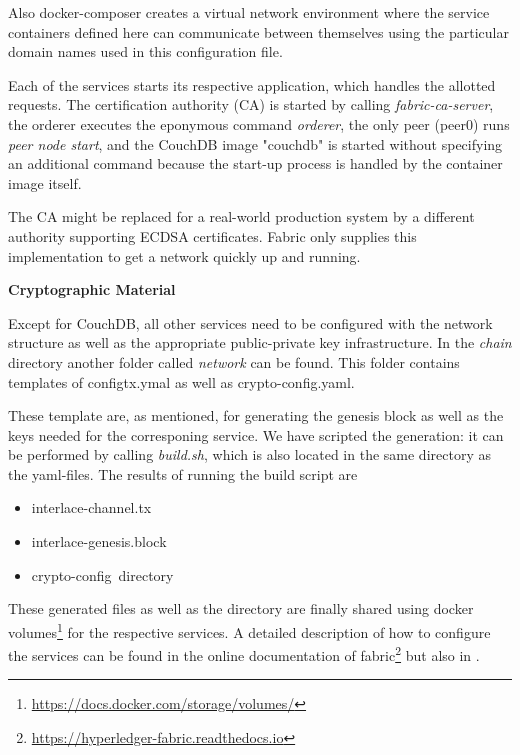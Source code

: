 Also docker-composer creates a virtual network environment where the service containers defined here can communicate between themselves using the particular domain names used in this configuration file.

Each of the services starts its respective application, which handles the allotted requests. The certification authority (CA) is started by calling \textit{fabric-ca-server}, the orderer executes the eponymous command \textit{orderer}, the only peer (peer0) runs \textit{peer node start}, and the CouchDB image "couchdb" is started without specifying an additional command because the start-up process is handled by the container image itself.   

The CA might be replaced for a real-world production system by a different authority supporting ECDSA certificates. Fabric only supplies this implementation to get a network quickly up and running.

\textbf{Cryptographic Material}

Except for CouchDB, all other services need to be configured with the network structure as well as the appropriate public-private key infrastructure. In the \textit{chain} directory another folder called \textit{network} can be found. This folder contains templates of configtx.ymal as well as crypto-config.yaml. 

These template are, as mentioned, for generating the genesis block as well as the keys needed for the corresponing service. We have scripted the generation: it can be performed by calling \textit{build.sh}, which is also located in the same directory as the yaml-files. The results of running the build script are
\begin{itemize}
	\item interlace-channel.tx
	\item interlace-genesis.block
	\item crypto-config\ directory
\end{itemize}
These generated files as well as the directory are finally shared using docker volumes\footnote{\url{https://docs.docker.com/storage/volumes/}} for the respective services. A detailed description of how to configure the services can be found in the online documentation of fabric\footnote{\url{https://hyperledger-fabric.readthedocs.io}} but also in \cite{HandsOnBlockchainHyperledger2018}.


